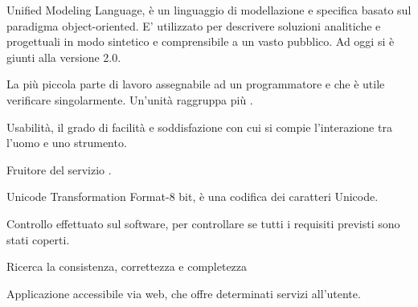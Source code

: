 \begin{itemize}


Unified Modeling Language, è un linguaggio di modellazione e specifica basato sul paradigma object-oriented. 
E' utilizzato per descrivere soluzioni analitiche e progettuali in modo sintetico e comprensibile a un vasto pubblico.
Ad oggi si è giunti alla versione 2.0.


La più piccola parte di lavoro assegnabile ad un programmatore e che è utile verificare singolarmente. Un'unità raggruppa più .

Usabilità, il grado di facilità e soddisfazione con cui si compie l'interazione tra l'uomo e uno strumento.


Fruitore del servizio \ProjectName{}.


Unicode Transformation Format-8 bit, è una codifica dei caratteri Unicode. 

\end{itemize}


\begin{itemize}


Controllo effettuato sul software, per controllare se tutti i requisiti previsti sono stati coperti.


Ricerca la consistenza, correttezza e completezza

\end{itemize}


\begin{itemize}


Applicazione accessibile via web, che offre determinati servizi all'utente.

\end{itemize}


%


